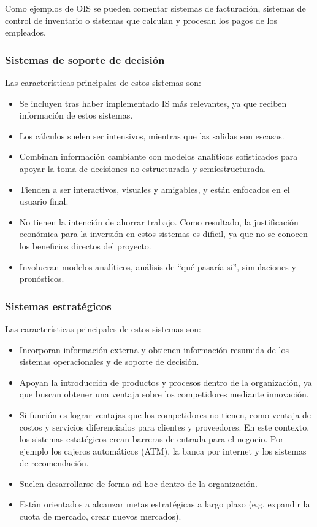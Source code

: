 Como ejemplos de OIS se pueden comentar sistemas de facturación, sistemas de control de inventario o sistemas que calculan y procesan los pagos de los empleados. 

\subsubsection{Sistemas de soporte de decisión}

Las características principales de estos sistemas son:
\begin{itemize}
\item Se incluyen tras haber implementado IS más relevantes, ya que reciben información de estos sistemas.
\item Los cálculos suelen ser intensivos, mientras que las salidas son escasas. 
\item Combinan información cambiante con modelos analíticos sofisticados para apoyar la toma de decisiones no estructurada y semiestructurada. 
\item Tienden a ser interactivos, visuales y amigables, y están enfocados en el usuario final.
\item No tienen la intención de ahorrar trabajo. Como resultado, la justificación económica para la inversión en estos sistemas es dificil, ya que no se conocen los beneficios directos del proyecto. 
\item Involucran modelos analíticos, análisis de ``qué pasaría si'', simulaciones y pronósticos.
\end{itemize}

\subsubsection{Sistemas estratégicos}

Las características principales de estos sistemas son:
\begin{itemize}
\item Incorporan información externa y obtienen información resumida de los sistemas operacionales y de soporte de decisión.
\item Apoyan la introducción de productos y procesos dentro de la organización, ya que buscan obtener una ventaja sobre los competidores mediante innovación.
\item Si función es lograr ventajas que los competidores no tienen, como ventaja de costos y servicios diferenciados para clientes y proveedores. En este contexto, los sistemas estatégicos crean barreras de entrada para el negocio. Por ejemplo los cajeros automáticos (ATM), la banca por internet y los sistemas de recomendación.
\item Suelen desarrollarse de forma ad hoc dentro de la organización.
\item Están orientados a alcanzar metas estratégicas a largo plazo (e.g. expandir la cuota de mercado, crear nuevos mercados).
\end{itemize}

